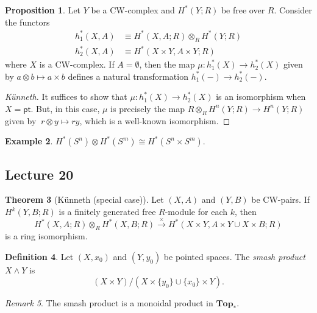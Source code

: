 \documentclass[10pt,letterpaper,cm]{nupset}
\theoremstyle{definition}
\newtheorem{definition}{Definition}[subsection]
\newtheorem{exmp}[definition]{Example}
\theoremstyle{theorem}
\newtheorem{theorem}[definition]{Theorem}
\newtheorem{prop}[definition]{Proposition}
\theoremstyle{remark}
\newtheorem{remark}[definition]{Remark}
\newcommand{\1}{\mathbb{1}}
\newcommand{\0}{\vec 0}
\newcommand{\pt}{\mathsf{pt}}
\begin{document}
\begin{prop}
Let $Y$ be a CW-complex and $H^{\ast}(Y; R)$ be free over $R$. Consider the functors 
\begin{align*} h^{\ast}_1(X, A)&  \equiv H^{\ast}(X, A; R) \otimes_R H^{\ast}(Y; R) \\ h_2^{\ast}(X, A) & \equiv H^{\ast}(X \times Y, A \times Y; R)
 \end{align*} where $X$ is a CW-complex. If $A= \emptyset$, then the map $\mu : h_1^{\ast}(X) \to h_2^{\ast}(X)$ given by $a \otimes b \mapsto a \times b$ defines a natural transformation $h_1^{\ast}({-}) \to h_2^{\ast}({-})$. 
\end{prop}

\begin{proof}[K\"unneth]
It suffices to show that $\mu : h_1^{\ast}(X) \to h_2^{\ast}(X)$ is an isomorphism when $X = \pt$. But, in this case, $\mu$ is precisely the map $R\otimes_R H^n(Y; R) \to H^n(Y; R)$ given by $\ r \otimes y \mapsto ry$, which is a well-known isomorphism.  
\end{proof}

\begin{exmp}
 $H^{\ast}(S^n) \otimes  H^{\ast}(S^m) \cong H^{\ast}(S^n \times S^m)$.
 \end{exmp}

\subsection{Lecture 20}

\begin{theorem}[K\"unneth (special case)]
Let $(X, A)$ and $(Y, B)$ be CW-pairs. If $H^k(Y, B; R)$ is a finitely generated free $R$-module for each $k$, then $$ H^{\ast}(X, A; R) \otimes_R H^{\ast}(X, B; R) \overset{\times}{\longrightarrow} H^{\ast}(X \times Y, A \times Y \cup X \times B; R)$$ is a ring isomorphism. 
\end{theorem}

\begin{definition}
Let $(X, x_0)$ and $(Y, y_0)$ be pointed spaces. The \textit{smash product $X \wedge Y$} is $$(X \times Y)/(X \times \{y_0\} \cup \{x_0\} \times Y).$$
\end{definition}

\begin{remark}
The smash product is a monoidal product in $\mathbf{Top}_{\ast}$.
\end{remark}
\end{document}
